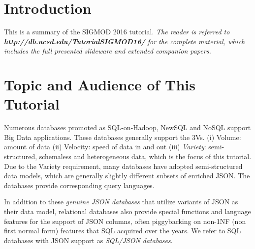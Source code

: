 


\section{Introduction}
This is a summary of the SIGMOD 2016 tutorial. \textit{The reader is referred to \textbf{http://db.ucsd.edu/TutorialSIGMOD16/} for the complete material, which includes the full presented slideware and extended companion papers.}


\section{Topic and Audience of This Tutorial}
Numerous databases promoted as SQL-on-Hadoop, NewSQL and NoSQL support Big Data applications. These databases generally support the 3Vs.%
(i) Volume: amount of data (ii) Velocity: speed of data in and out (iii) \emph{Variety}: semi-structured, schemaless and heterogeneous data, which is the focus of this tutorial. Due to the Variety requirement, many databases have adopted semi-structured data models, which are generally slightly different subsets of enriched JSON. The databases provide corresponding query languages. 

In addition to these {\em genuine JSON databases} that utilize variants of JSON as their data model, relational databases also provide special functions and language features for the support of JSON columns, often piggybacking on non-1NF (non first normal form) features that SQL acquired over the years. We refer to SQL databases with JSON support as {\em SQL/JSON databases}. 

